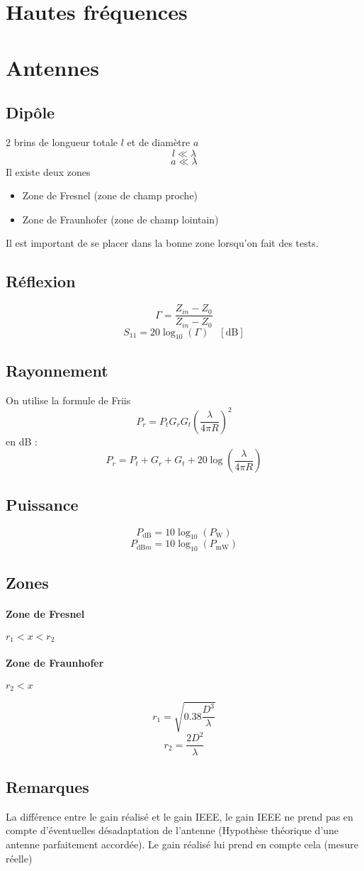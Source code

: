 \documentclass[resume]{subfiles}
\begin{document}
\section{Hautes fréquences}
\section{Antennes}
\subsection{Dipôle}
2 brins de longueur totale $l$ et de diamètre $a$
$$l\ll \lambda$$
$$a\ll\lambda$$
Il existe deux zones
\begin{itemize}
\item Zone de Fresnel (zone de champ proche)
\item Zone de Fraunhofer (zone de champ lointain)
\end{itemize}
Il est important de se placer dans la bonne zone lorsqu'on fait des tests.
\subsection{Réflexion}
$$\Gamma=\frac{Z_{in}-Z_0}{Z_{in}-Z_0}$$
$$S_{11}=20\log_{10}(\Gamma)\quad [\si{\deci\bel}]$$
\subsection{Rayonnement}
On utilise la formule de Friis
$$P_r=P_tG_rG_t\left(\frac{\lambda}{4\pi R}\right)^2$$
en dB :
$$P_r=P_t+G_r+G_t+20\log\left(\frac{\lambda}{4\pi R}\right)$$
\subsection{Puissance}
$$\boxed{P_{\si{\deci\bel}}=10\log_{10}\left(P_{\si{\watt}}\right)}$$
$$\boxed{P_{\si{\deci\bel m}}=10\log_{10}\left(P_{\si{\milli\watt}}\right)}$$
\subsection{Zones}
\paragraph{Zone de Fresnel} $r_1 < x < r_2$
\paragraph{Zone de Fraunhofer} $ r_2 < x$

$$r_1=\sqrt{0.38\frac{D^3}{\lambda}}$$
$$r_2=\frac{2D^2}{\lambda}$$
\subsection{Remarques}
La différence entre le gain réalisé et le gain IEEE, le gain IEEE ne prend pas en compte d'éventuelles désadaptation de l'antenne (Hypothèse théorique d'une antenne parfaitement accordée). Le gain réalisé lui prend en compte cela (mesure réelle)
\end{document}
